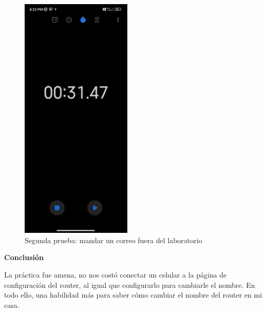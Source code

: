 \documentclass[11pt]{article}
\begin{document}
\begin{figure}[htbp]
\centering
\includegraphics[width=200px]{./tiempo1.jpeg}
\caption{Segunda prueba: mandar un correo fuera del laboratorio}
\end{figure}

\textbf{Conclusión}

La práctica fue amena, no nos costó conectar un celular a la página de configuración
del router, al igual que configurarlo para cambiarle el nombre. En todo ello,
una habilidad más para saber cómo cambiar el nombre del router en mi casa.
\end{document}

